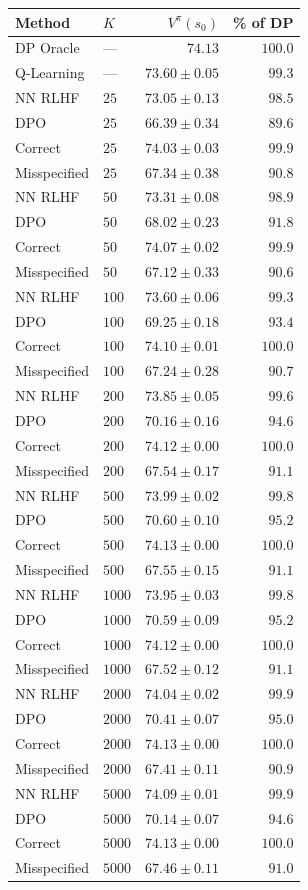 \begin{tabular}{llrr}
\hline
Method & $K$ & $V^\pi(s_0)$ & \% of DP \\
\hline
DP Oracle & --- & $74.13$ & $100.0$ \\
Q-Learning & --- & $73.60 \pm 0.05$ & $99.3$ \\
\hline
NN RLHF & $25$ & $73.05 \pm 0.13$ & $98.5$ \\
DPO & $25$ & $66.39 \pm 0.34$ & $89.6$ \\
Correct & $25$ & $74.03 \pm 0.03$ & $99.9$ \\
Misspecified & $25$ & $67.34 \pm 0.38$ & $90.8$ \\
\hline
NN RLHF & $50$ & $73.31 \pm 0.08$ & $98.9$ \\
DPO & $50$ & $68.02 \pm 0.23$ & $91.8$ \\
Correct & $50$ & $74.07 \pm 0.02$ & $99.9$ \\
Misspecified & $50$ & $67.12 \pm 0.33$ & $90.6$ \\
\hline
NN RLHF & $100$ & $73.60 \pm 0.06$ & $99.3$ \\
DPO & $100$ & $69.25 \pm 0.18$ & $93.4$ \\
Correct & $100$ & $74.10 \pm 0.01$ & $100.0$ \\
Misspecified & $100$ & $67.24 \pm 0.28$ & $90.7$ \\
\hline
NN RLHF & $200$ & $73.85 \pm 0.05$ & $99.6$ \\
DPO & $200$ & $70.16 \pm 0.16$ & $94.6$ \\
Correct & $200$ & $74.12 \pm 0.00$ & $100.0$ \\
Misspecified & $200$ & $67.54 \pm 0.17$ & $91.1$ \\
\hline
NN RLHF & $500$ & $73.99 \pm 0.02$ & $99.8$ \\
DPO & $500$ & $70.60 \pm 0.10$ & $95.2$ \\
Correct & $500$ & $74.13 \pm 0.00$ & $100.0$ \\
Misspecified & $500$ & $67.55 \pm 0.15$ & $91.1$ \\
\hline
NN RLHF & $1000$ & $73.95 \pm 0.03$ & $99.8$ \\
DPO & $1000$ & $70.59 \pm 0.09$ & $95.2$ \\
Correct & $1000$ & $74.12 \pm 0.00$ & $100.0$ \\
Misspecified & $1000$ & $67.52 \pm 0.12$ & $91.1$ \\
\hline
NN RLHF & $2000$ & $74.04 \pm 0.02$ & $99.9$ \\
DPO & $2000$ & $70.41 \pm 0.07$ & $95.0$ \\
Correct & $2000$ & $74.13 \pm 0.00$ & $100.0$ \\
Misspecified & $2000$ & $67.41 \pm 0.11$ & $90.9$ \\
\hline
NN RLHF & $5000$ & $74.09 \pm 0.01$ & $99.9$ \\
DPO & $5000$ & $70.14 \pm 0.07$ & $94.6$ \\
Correct & $5000$ & $74.13 \pm 0.00$ & $100.0$ \\
Misspecified & $5000$ & $67.46 \pm 0.11$ & $91.0$ \\
\hline
\end{tabular}
